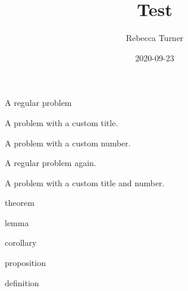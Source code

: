 \documentclass[knowledge]{mathnotes-hw}
\title{Test}
\author{Rebecca Turner}
\date{2020-09-23}
\begin{document}
\maketitle

\tableofcontents
\pagebreak

\begin{problem}
  A regular problem
\end{problem}

\begin{problem}[title=Euler's Theorem]
  A problem with a custom title.
\end{problem}

\begin{problem}[6]
  A problem with a custom number.
\end{problem}

\pagebreak
\begin{problem}
  A regular problem again.
\end{problem}

\begin{problem}[title=Revenge of $\Z$, Hatcher 3.b]
  A problem with a custom title and number.
\end{problem}

\begin{thm}
  theorem
\end{thm}

\begin{lem}
  lemma
\end{lem}

\begin{cor}
  corollary
\end{cor}

\begin{prop}
  proposition
\end{prop}

\begin{defn}
  definition
\end{defn}
\end{document}
